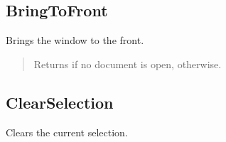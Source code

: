 \documentclass[letterpaper,12pt,english,openany,oneside]{sphinxmanual}
\begin{document}
\subsection{BringToFront}
\label{\detokenize{IAC_API_OLE_Objects:bringtofront}}
Brings the window to the front.


\begin{sphinxVerbatim}[commandchars=\\\{\}]
 
\end{sphinxVerbatim}

\begin{quote}

Returns  if no document is open,  otherwise.
\end{quote}




\subsection{ClearSelection}
\label{\detokenize{IAC_API_OLE_Objects:clearselection}}
Clears the current selection.


\begin{sphinxVerbatim}[commandchars=\\\{\}]
 
\end{sphinxVerbatim}
\end{document}
